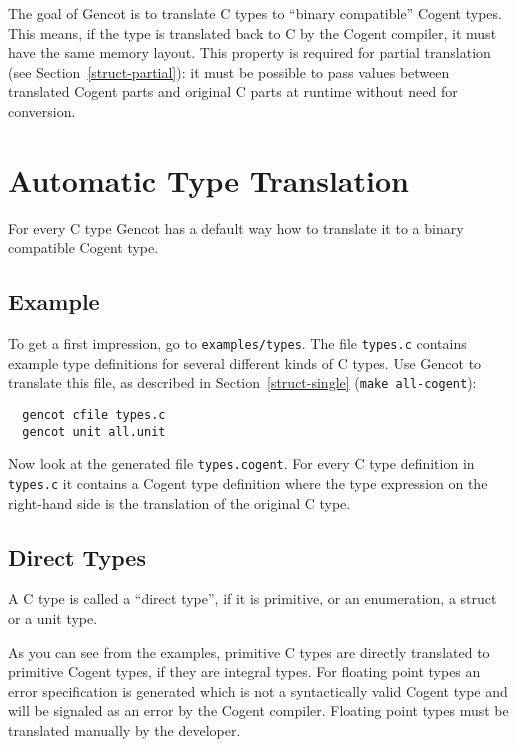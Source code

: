\documentclass[a4paper]{report}
\newcommand{\code}[1]{\textnormal{\texttt{#1}}}
\begin{document}
The goal of Gencot is to translate C types to ``binary compatible'' Cogent types. This means, if the type is 
translated back to C by the Cogent compiler, it must have the same memory layout. This property is required
for partial translation (see Section~\ref{struct-partial}): it must be possible to pass values between 
translated Cogent parts and original C parts at runtime without need for conversion.

\section{Automatic Type Translation}
\label{types-auto}

For every C type Gencot has a default way how to translate it to a binary compatible Cogent type. 

\subsection{Example}
\label{types-auto-example}

To get a first impression, go to \code{examples/types}. The file \code{types.c} contains example type definitions
for several different kinds of C types. Use Gencot to translate this file, as described in Section~\ref{struct-single} 
(\code{make all-cogent}):
\begin{verbatim}
  gencot cfile types.c
  gencot unit all.unit
\end{verbatim}

Now look at the generated file \code{types.cogent}. For every C type definition in \code{types.c} it contains 
a Cogent type definition where the type expression on the right-hand side is the translation of the original C type.

\subsection{Direct Types}
\label{types-auto-direct}

A C type is called a ``direct type'', if it is primitive, or an enumeration, a struct or a unit type.

As you can see from the examples, primitive C types are directly translated to primitive Cogent types, if they are
integral types. For floating point types an error specification is generated which is not a syntactically valid 
Cogent type and will be signaled as an error by the Cogent compiler. Floating point types must be translated manually
by the developer.
\end{document}
